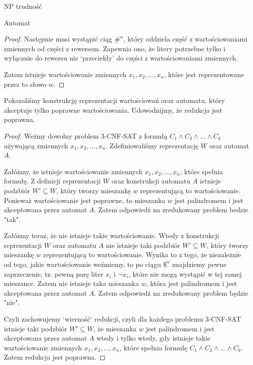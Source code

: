 \documentclass{article}
\theoremstyle{definition}
\theoremstyle{remark}
\begin{document}
\begin{section}{NP trudność}
\begin{subsection}{Automat}
\begin{proof}
            Następnie musi wystąpić ciąg $ \#^n $, który oddziela część z wartościowaniami
            zmiennych od części z rewersem. Zapewnia ono, że litery potrzebne tylko i wyłącznie do rewersu
            nie `przeciekły' do części z wartościowaniami zmiennych.

            Zatem istnieje wartościowanie zmiennych $x_1, x_2, \ldots, x_n$, które jest reprezentowane przez to słowo $w$.
     \end{proof}
 \end{subsection}

 Pokazaliśmy konstrukcję reprezentacji wartościowań oraz automatu, który
 akceptuje tylko poprawne wartościowania. Udowodnijmy, że redukcja jest
 poprawna.

 \begin{proof}

     Weźmy dowolny problem 3-CNF-SAT z formułą $C_1 \land C_2 \land \ldots \land
         C_k$ używającą zmiennych $x_1, x_2, \ldots, x_n$. Zdefiniowaliśmy reprezentację
     $W$ oraz automat $A$.

     Załóżmy, że istnieje wartościowanie zmiennych $x_1, x_2, \ldots, x_n$, które
     spełnia formułę. Z definicji reprezentacji $W$ oraz konstrukcji automatu $A$
     istnieje podzbiór $W' \subseteq W$, który tworzy mieszankę $w$ reprezentującą
     to wartościowanie. Ponieważ wartościowanie jest poprawne, to mieszanka $w$ jest
     palindromem i jest akceptowana przez automat $A$. Zatem odpowiedź na
     zredukowany problem bedzie "tak".

     Załóżmy teraz, że nie istnieje takie wartościowanie. Wtedy z konstrukcji
     reprezentacji $W$ oraz automatu $A$ nie istnieje taki podzbiór $W' \subseteq
         W$, który tworzy mieszankę $w$ reprezentującą to wartościowanie. Wynika to z
     tego, że niezależnie od tego, jakie wartościowanie weźmiemy, to po ciągu $ \$^n
     $ znajdziemy pewne zaprzeczenie, tz. pewną parę liter $ x_i $ i $ \neg x_i $,
     które nie mogą wystąpić w tej samej mieszance. Zatem nie istnieje taka
     mieszanka $w$, która jest palindromem i jest akceptowana przez automat $A$.
     Zatem odpowiedź na zredukowany problem będzie "nie".

     Czyli zachowujemy `wierność` redukcji, czyli dla każdego problemu 3-CNF-SAT
     istnieje taki podzbiór $W' \subseteq W$, że mieszanka $w$ jest palindromem i
     jest akceptowana przez automat $A$ wtedy i tylko wtedy, gdy istnieje takie
     wartościowanie zmiennych $x_1, x_2, \ldots, x_n$, które spełnia formułę $C_1
         \land C_2 \land \ldots \land C_k$. Zatem redukcja jest poprawna.

 \end{proof}

\end{section}
\end{document}
